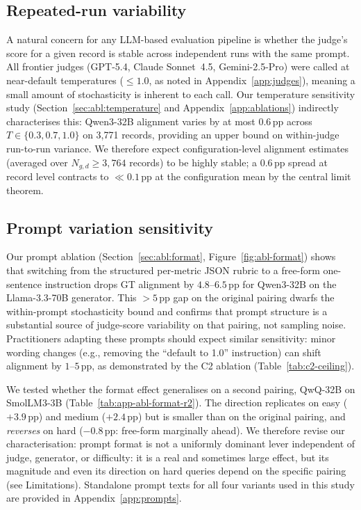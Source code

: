 \subsection*{Repeated-run variability}

A natural concern for any LLM-based evaluation pipeline is whether the judge's score for a given record is stable across independent runs with the same prompt. All frontier judges (GPT-5.4, Claude Sonnet~4.5, Gemini-2.5-Pro) were called at near-default temperatures ($\leq 1.0$, as noted in Appendix~\ref{app:judges}), meaning a small amount of stochasticity is inherent to each call. Our temperature sensitivity study (Section~\ref{sec:abl:temperature} and Appendix~\ref{app:ablations}) indirectly characterises this: Qwen3-32B alignment varies by at most $0.6$\,pp across $T \in \{0.3, 0.7, 1.0\}$ on 3,771 records, providing an upper bound on within-judge run-to-run variance. We therefore expect configuration-level alignment estimates (averaged over $N_{g,d} \geq 3{,}764$ records) to be highly stable; a $0.6$\,pp spread at record level contracts to ${\ll}0.1$\,pp at the configuration mean by the central limit theorem.


\subsection*{Prompt variation sensitivity}

Our prompt ablation (Section~\ref{sec:abl:format}, Figure~\ref{fig:abl-format}) shows that switching from the structured per-metric JSON rubric to a free-form one-sentence instruction drops GT alignment by $4.8$--$6.5$\,pp for Qwen3-32B on the Llama-3.3-70B generator. This $>5$\,pp gap on the original pairing dwarfs the within-prompt stochasticity bound and confirms that prompt structure is a substantial source of judge-score variability on that pairing, not sampling noise. Practitioners adapting these prompts should expect similar sensitivity: minor wording changes (e.g., removing the ``default to 1.0'' instruction) can shift alignment by $1$--$5$\,pp, as demonstrated by the C2 ablation (Table~\ref{tab:c2-ceiling}).

We tested whether the format effect generalises on a second pairing, QwQ-32B on SmolLM3-3B (Table~\ref{tab:app-abl-format-r2}). The direction replicates on easy ($+3.9$\,pp) and medium ($+2.4$\,pp) but is smaller than on the original pairing, and \emph{reverses} on hard ($-0.8$\,pp: free-form marginally ahead). We therefore revise our characterisation: prompt format is not a uniformly dominant lever independent of judge, generator, or difficulty: it is a real and sometimes large effect, but its magnitude and even its direction on hard queries depend on the specific pairing (see Limitations). Standalone prompt texts for all four variants used in this study are provided in Appendix~\ref{app:prompts}.

